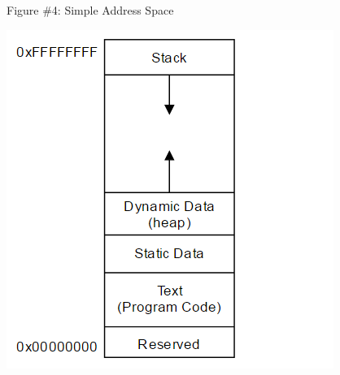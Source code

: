\documentclass[12pt]{extarticle}
\begin{document}
\newpage
\begin{center}
    Figure \#4: Simple Address Space
\end{center}
\begin{center}
    \includegraphics{memory_map.png}
\end{center}
\end{document}

